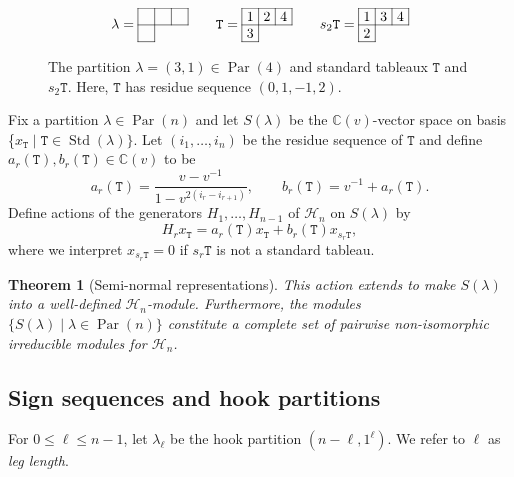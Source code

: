 \documentclass [12pt, letterpaper, oneside] {amsart}
\newcommand \Par {\operatorname {Par}}
\newcommand \Std {\operatorname {Std}}
\renewcommand \l {\lambda}
\newcommand \mc {\mathcal}
\newcommand \mB {\mathbb}
\newcommand \mt {\mathtt}
\theoremstyle {plain}
\newtheorem {thm} [subsection] {Theorem}
\begin{document}
\begin {figure} [h]
\[
\l = \vcenter {\xy 0;/r.10pc/:
(0,0);(30,0)**@{-},
(0,-10);(30,-10)**@{-},
(0,-20);(10,-20)**@{-},
(0,0);(0,-20)**@{-},
(10,0);(10,-20)**@{-},
(20,0);(20,-10)**@{-},
(30,0);(30,-10)**@{-}
\endxy}
\qquad
\mt{T} = \vcenter {\xy 0;/r.10pc/:
(0,0);(30,0)**@{-},
(0,-10);(30,-10)**@{-},
(0,-20);(10,-20)**@{-},
(0,0);(0,-20)**@{-},
(10,0);(10,-20)**@{-},
(20,0);(20,-10)**@{-},
(30,0);(30,-10)**@{-},
(5,-5)*{1},
(15,-5)*{2},
(5,-15)*{3},
(25,-5)*{4}
\endxy}
\qquad
s_2 \mt{T} = \vcenter {\xy 0;/r.10pc/:
(0,0);(30,0)**@{-},
(0,-10);(30,-10)**@{-},
(0,-20);(10,-20)**@{-},
(0,0);(0,-20)**@{-},
(10,0);(10,-20)**@{-},
(20,0);(20,-10)**@{-},
(30,0);(30,-10)**@{-},
(5,-5)*{1},
(15,-5)*{3},
(5,-15)*{2},
(25,-5)*{4}
\endxy}
\]
\caption {The partition $\l = (3,1) \in \Par(4)$ and standard tableaux $\mt{T}$ and $s_2\mt{T}$.  Here, $\mt{T}$ has residue sequence $(0,1,-1,2)$.}
\end {figure}

Fix a partition $\l \in \Par(n)$ and let $S(\l)$ be the $\mB{C}(v)$-vector space on basis \{$x_{\mt{T}} \;|\; \mt{T} \in \Std(\l)\}$.  Let $(i_1, \ldots, i_n)$ be the residue sequence of $\mt{T}$ and define 
$a_r(\mt{T}), b_r(\mt{T}) \in \mB{C}(v)$ to be
\begin {equation}\label{abs}
a_r(\mt{T}) = \frac {v - v^{-1}} {1 - v^{2(i_r-i_{r+1})}},\qquad
b_r(\mt{T}) = v^{-1}+a_r(\mt{T}).
\end {equation}
Define actions of the generators $H_1, \ldots, H_{n-1}$ of $\mc{H}_n$ on $S(\l)$ by
\begin {equation} \label {s-n formula}
H_r x_{\mt{T}} = a_r (\mt{T})x_{\mt{T}} + b_r (\mt{T}) x_{s_r\mt{T}},
\end {equation}
where we interpret $x_{s_r \mt{T}} = 0$ if $s_r \mt{T}$ is not a standard tableau.

\begin {thm} [Semi-normal representations] \label {irrep thm}
This action extends to make $S(\l)$ into a well-defined $\mc{H}_n$-module.  Furthermore, the modules $\{S(\l) \; | \; \l \in \Par(n) \}$ constitute a complete set of pairwise non-isomorphic irreducible modules for $\mc{H}_n$.
\end {thm}

\subsection {Sign sequences and hook partitions}
For $0 \le \ell \le n-1$, let $\l_\ell$ be the hook partition $(n-\ell, 1^\ell)$.  We refer to $\ell$ as \emph {leg length}.
\end{document}
